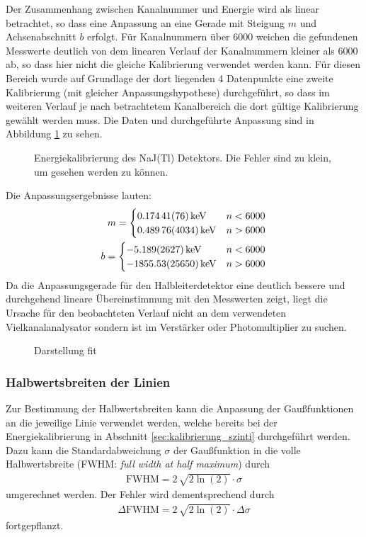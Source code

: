 \documentclass[11pt, a4paper]{article}
\numberwithin{equation}{section}
\begin{document}
Der Zusammenhang zwischen Kanalnummer und Energie wird als linear betrachtet, so dass eine Anpassung an eine Gerade mit Steigung $m$ und Achsenabschnitt $b$ erfolgt.
Für Kanalnummern über \num{6000} weichen die gefundenen Messwerte deutlich von dem linearen Verlauf der Kanalnummern kleiner als \num{6000} ab, so dass hier nicht die gleiche Kalibrierung verwendet werden kann.
Für diesen Bereich wurde auf Grundlage der dort liegenden \num{4} Datenpunkte eine zweite Kalibrierung (mit gleicher Anpassungshypothese) durchgeführt, so dass im weiteren Verlauf je nach betrachtetem Kanalbereich die dort gültige Kalibrierung gewählt werden muss. 
Die Daten und durchgeführte Anpassung sind in Abbildung \ref{fig:kalibrierung_szinti} zu sehen.
\begin{figure}[ht]
	\centering
	
	\caption{Energiekalibrierung des NaJ(Tl) Detektors. Die Fehler sind zu klein, um gesehen werden zu können.}
	\label{fig:kalibrierung_szinti}
\end{figure}
Die Anpassungsergebnisse lauten:
\begin{align}
	m = 
	\begin{cases}
	\SI{0.17441+-0.00076}{\kilo\electronvolt} & n < 6000 \\
	\SI{0.48976+-0.04034}{\kilo\electronvolt} & n > 6000
	\end{cases}\\
	b = 
	\begin{cases}
	\SI{-5.189+-2.627}{\kilo\electronvolt} & n < 6000 \\
	\SI{-1855.53+-256.50}{\kilo\electronvolt} & n > 6000
	\end{cases}
\end{align}
Da die Anpassungsgerade für den Halbleiterdetektor eine deutlich bessere und durchgehend lineare Übereinstimmung mit den Messwerten zeigt, liegt die Ursache für den beobachteten Verlauf nicht an dem verwendeten Vielkanalanalysator sondern ist im Verstärker oder Photomultiplier zu suchen.

\begin{figure}[h]
	\centering
	
	\caption{Darstellung fit}
	\label{fig:fit_darstellung_szinti}
\end{figure}

\subsubsection{Halbwertsbreiten der Linien}
Zur Bestimmung der Halbwertsbreiten kann die Anpassung der Gaußfunktionen an die jeweilige Linie verwendet werden, welche bereits bei der Energiekalibrierung in Abschnitt \ref{sec:kalibrierung_szinti} durchgeführt werden.
Dazu kann die Standardabweichung $\sigma$ der Gaußfunktion in die volle Halbwertsbreite (FWHM: \textit{full width at half maximum}) durch
\begin{align}
	\text{FWHM} = 2 \, \sqrt{2\ln(2)} \cdot \sigma
\end{align}
umgerechnet werden.
Der Fehler wird dementsprechend durch
\begin{align}
	\Delta \text{FWHM} = 2 \, \sqrt{2\ln(2)} \cdot \Delta \sigma
\end{align}
fortgepflanzt.
\end{document}
